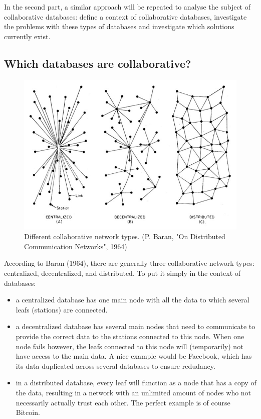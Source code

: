 \documentclass[11pt,a4paper]{article}
\begin{document}
In the second part, a similar approach will be repeated to analyse the subject of collaborative databases: define a context of collaborative databases, investigate the problems with these types of databases and investigate which solutions currently exist.

\subsection{Which databases are collaborative?}
\begin{figure}[h]
  \centering
  \includegraphics[width=.65\textwidth]{networktypes.jpg}
  \caption{Different collaborative network types. (P. Baran, "On Distributed Communication Networks", 1964)
  }
  \label{fig:networktypes}
\end{figure}

According to Baran (1964), there are generally three collaborative network types: centralized, decentralized, and distributed. To put it simply in the context of databases:
\begin{itemize}
  \item a centralized database has one main node with all the data to which several leafs (stations) are connected.
  \item a decentralized database has several main nodes that need to communicate to provide the correct data to the stations connected to this node. When one node fails however, the leafs connected to this node will (temporarily) not have access to the main data. A nice example would be Facebook, which has its data duplicated across several databases to ensure redudancy.
  \item in a distributed database, every leaf will function as a node that has a copy of the data, resulting in a network with an unlimited amount of nodes who not necessarily actually trust each other. The perfect example is of course Bitcoin.
\end{itemize}
\end{document}
